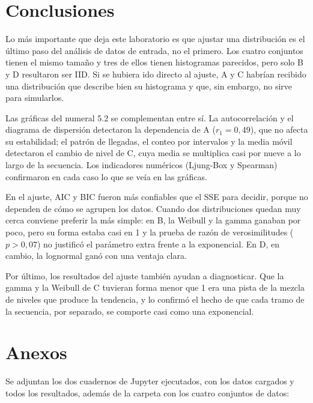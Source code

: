 \documentclass[11pt,letterpaper]{article}
\begin{document}
\section{Conclusiones}

Lo más importante que deja este laboratorio es que ajustar una distribución es el último paso del análisis de
datos de entrada, no el primero. Los cuatro conjuntos tienen el mismo tamaño y tres de ellos tienen histogramas
parecidos, pero solo B y D resultaron ser IID. Si se hubiera ido directo al ajuste, A y C habrían recibido una
distribución que describe bien su histograma y que, sin embargo, no sirve para simularlos.

Las gráficas del numeral 5.2 se complementan entre sí. La autocorrelación y el diagrama de dispersión detectaron la
dependencia de A ($r_1 = 0{,}49$), que no afecta su estabilidad; el patrón de llegadas, el conteo por intervalos y
la media móvil detectaron el cambio de nivel de C, cuya media se multiplica casi por nueve a lo largo de la
secuencia. Los indicadores numéricos (Ljung-Box y Spearman) confirmaron en cada caso lo que se veía en las gráficas.

En el ajuste, AIC y BIC fueron más confiables que el SSE para decidir, porque no dependen de cómo se agrupen los
datos. Cuando dos distribuciones quedan muy cerca conviene preferir la más simple: en B, la Weibull y la gamma ganaban
por poco, pero su forma estaba casi en 1 y la prueba de razón de verosimilitudes ($p > 0{,}07$) no justificó el
parámetro extra frente a la exponencial. En D, en cambio, la lognormal ganó con una ventaja clara.

Por último, los resultados del ajuste también ayudan a diagnosticar. Que la gamma y la Weibull de C tuvieran forma
menor que 1 era una pista de la mezcla de niveles que produce la tendencia, y lo confirmó el hecho de que cada tramo
de la secuencia, por separado, se comporte casi como una exponencial.

\section{Anexos}

Se adjuntan los dos cuadernos de Jupyter ejecutados, con los datos cargados y todos los resultados, además de la
carpeta con los cuatro conjuntos de datos:
\end{document}
